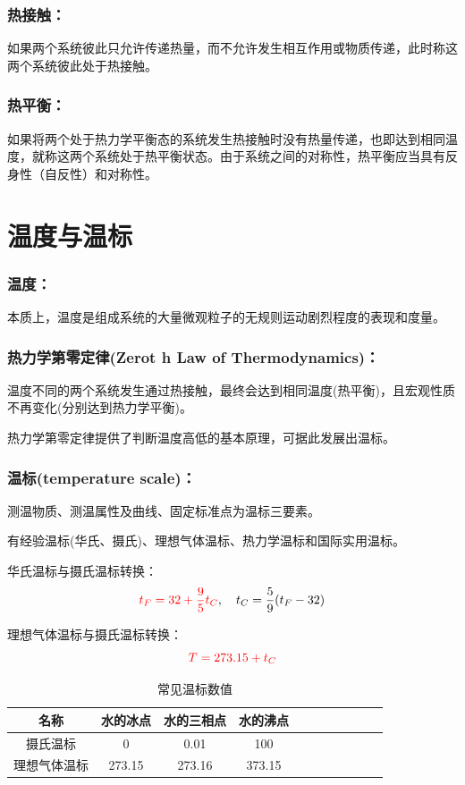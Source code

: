 \documentclass[zihao=-4,UTF8]{report}
\begin{document}
\subsubsection{热接触：}
如果两个系统彼此只允许传递热量，而不允许发生相互作用或物质传递，此时称这两个系统彼此处于热接触。
\subsubsection{热平衡：}
如果将两个处于热力学平衡态的系统发生热接触时没有热量传递，也即达到相同温度，就称这两个系统处于热平衡状态。{\color{gray}\small 由于系统之间的对称性，热平衡应当具有反身性（自反性）和对称性。}

\section{温度与温标}
\subsubsection{温度：}
本质上，温度是组成系统的大量微观粒子的无规则运动剧烈程度的表现和度量。
\subsubsection{热力学第零定律(Zerot h Law of Thermodynamics)：}
温度不同的两个系统发生通过热接触，最终会达到相同温度(热平衡)，且宏观性质不再变化(分别达到热力学平衡)。\par
{\color{gray}\small 热力学第零定律提供了判断温度高低的基本原理，可据此发展出温标。}
\subsubsection{温标(temperature scale)：}
测温物质、测温属性及曲线、固定标准点为温标三要素。\par
有经验温标(华氏、摄氏)、理想气体温标、热力学温标和国际实用温标。\par
华氏温标与摄氏温标转换：
\begin{equation}
    {\color{red} t_F = 32 + \frac{9}{5}t_C},\ \ \  t_C = \frac{5}{9}(t_F-32)
\end{equation}\par
理想气体温标与摄氏温标转换：
\begin{equation}
    {\color{red} T = 273.15 + t_C}
\end{equation}
\begin{table}[H]
    \centering
    \caption{常见温标数值}
    \begin{tabular}{ccccccccccc}
    \toprule
    名称 & 水的冰点 & 水的三相点 & 水的沸点\\
    \midrule
    摄氏温标 & 0 & 0.01 & 100\\
    理想气体温标& 273.15& 273.16 & 373.15\\
    \bottomrule
    \end{tabular}
\end{table}
\end{document}
